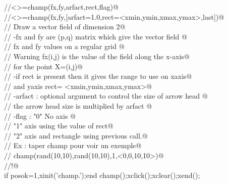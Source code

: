 
\verb@//<>=champ(fx,fy,arfact,rect,flag)@ \\
\verb@//<>=champ(fx,fy,[arfact=1.0,rect=<xmin,ymin,xmax,ymax>,last])@ \\
\verb@// Draw a vector field of dimension 2@ \\
\verb@//  -fx and fy are (p,q) matrix which give the vector field @ \\
\verb@//     fx and fy values on a regular grid @ \\
\verb@//     Warning fx(i,j) is the value of the field along the x-axis@ \\
\verb@//     for the point X=(i,j)@ \\
\verb@//  -if rect is present then it gives the range to use on xaxis@ \\
\verb@//      and yaxis rect= <xmin,ymin,xmax,ymax>@ \\
\verb@//  -arfact : optional argument to control the size of arrow head @ \\
\verb@//            the arrow head size is multiplied by arfact @ \\
\verb@//  -flag : "0" No axis @ \\
\verb@//          "1" axis using the value of rect@ \\
\verb@//          "2" axis and rectangle using previous call.@ \\
\verb@// Ex : taper champ pour voir un exemple@ \\
\verb@//   champ(rand(10,10),rand(10,10),1,<0,0,10,10>)@ \\
\verb@//!@ \\
if posok=1,xinit('champ.');end
champ();xclick();xclear();xend();

